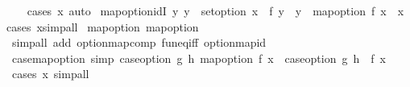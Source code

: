 \begin{isabellebody}
%
\isadelimproof
\ \ %
\endisadelimproof
%
\isatagproof
{}\isamarkupfalse%
\ {\isacharparenleft}{\kern0pt}cases\ x{\isacharparenright}{\kern0pt}\ auto%
\endisatagproof
{\isafoldproof}%
%
\isadelimproof
\isanewline
%
\endisadelimproof
\isanewline
{}\isamarkupfalse%
\ map{\isacharunderscore}{\kern0pt}option{\isacharunderscore}{\kern0pt}idI{\isacharcolon}{\kern0pt}\ {\isachardoublequoteopen}{\isacharparenleft}{\kern0pt}{\isasymAnd}y{\isachardot}{\kern0pt}\ y\ {\isasymin}\ set{\isacharunderscore}{\kern0pt}option\ x\ {\isasymLongrightarrow}\ f\ y\ {\isacharequal}{\kern0pt}\ y{\isacharparenright}{\kern0pt}\ {\isasymLongrightarrow}\ map{\isacharunderscore}{\kern0pt}option\ f\ x\ {\isacharequal}{\kern0pt}\ x{\isachardoublequoteclose}\isanewline
%
\isadelimproof
%
\endisadelimproof
%
\isatagproof
{}\isamarkupfalse%
{\isacharparenleft}{\kern0pt}cases\ x{\isacharparenright}{\kern0pt}{\isacharparenleft}{\kern0pt}simp{\isacharunderscore}{\kern0pt}all{\isacharparenright}{\kern0pt}%
\endisatagproof
{\isafoldproof}%
%
\isadelimproof
\isanewline
%
\endisadelimproof
\isanewline
{}\isamarkupfalse%
\ map{\isacharunderscore}{\kern0pt}option{\isacharcolon}{\kern0pt}\ map{\isacharunderscore}{\kern0pt}option\isanewline
%
\isadelimproof
\ \ %
\endisadelimproof
%
\isatagproof
{}\isamarkupfalse%
\ {\isacharparenleft}{\kern0pt}simp{\isacharunderscore}{\kern0pt}all\ add{\isacharcolon}{\kern0pt}\ option{\isachardot}{\kern0pt}map{\isacharunderscore}{\kern0pt}comp\ fun{\isacharunderscore}{\kern0pt}eq{\isacharunderscore}{\kern0pt}iff\ option{\isachardot}{\kern0pt}map{\isacharunderscore}{\kern0pt}id{\isacharparenright}{\kern0pt}%
\endisatagproof
{\isafoldproof}%
%
\isadelimproof
\isanewline
%
\endisadelimproof
\isanewline
{}\isamarkupfalse%
\ case{\isacharunderscore}{\kern0pt}map{\isacharunderscore}{\kern0pt}option\ {\isacharbrackleft}{\kern0pt}simp{\isacharbrackright}{\kern0pt}{\isacharcolon}{\kern0pt}\ {\isachardoublequoteopen}case{\isacharunderscore}{\kern0pt}option\ g\ h\ {\isacharparenleft}{\kern0pt}map{\isacharunderscore}{\kern0pt}option\ f\ x{\isacharparenright}{\kern0pt}\ {\isacharequal}{\kern0pt}\ case{\isacharunderscore}{\kern0pt}option\ g\ {\isacharparenleft}{\kern0pt}h\ {\isasymcirc}\ f{\isacharparenright}{\kern0pt}\ x{\isachardoublequoteclose}\isanewline
%
\isadelimproof
\ \ %
\endisadelimproof
%
\isatagproof
{}\isamarkupfalse%
\ {\isacharparenleft}{\kern0pt}cases\ x{\isacharparenright}{\kern0pt}\ simp{\isacharunderscore}{\kern0pt}all%
\endisatagproof
{\isafoldproof}%
%
\isadelimproof

\end{isabellebody}
